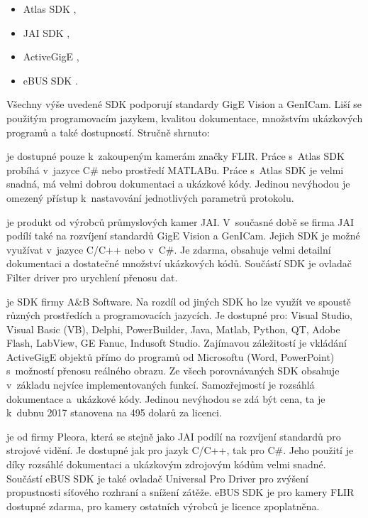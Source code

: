     \begin{itemize}[noitemsep]
    \item Atlas SDK \cite{atlasSdk},
    \item JAI SDK \cite{jaiSdk},
    \item ActiveGigE \cite{activeGige},
    \item eBUS SDK \cite{ebusSdk}.
    \end{itemize}
      
    Všechny výše uvedené SDK podporují standardy GigE Vision a GenICam. Liší se použitým programovacím jazykem, kvalitou dokumentace, množstvím ukázkových programů a také dostupností. Stručně shrnuto:
    
    \begin{description}[align=left]
	\item [Atlas SDK] je dostupné pouze k~zakoupeným kamerám značky FLIR. Práce s~Atlas SDK probíhá v~jazyce C\# nebo prostředí MATLABu. Práce s~Atlas SDK je velmi snadná, má velmi dobrou dokumentaci a ukázkové kódy. Jedinou nevýhodou je omezený přístup k~nastavování jednotlivých parametrů protokolu.
    \item [JAI SDK] je produkt od výrobců průmyslových kamer JAI. V~současné době se firma JAI podílí také na rozvíjení standardů GigE Vision a GenICam. Jejich SDK je možné využívat v~jazyce C/C++ nebo v~C\#. Je zdarma, obsahuje velmi detailní dokumentaci a dostatečné množství ukázkových kódů. Součástí SDK je ovladač Filter driver pro urychlení přenosu dat. 
    \item [ActiveGigE] je SDK firmy A\&B Software. Na rozdíl od jiných SDK ho lze využít ve spoustě různých prostředích a programovacích jazycích. Je dostupné pro: Visual Studio, Visual Basic (VB), Delphi, PowerBuilder, Java, Matlab, Python, QT, Adobe Flash, LabView, GE Fanuc, Indusoft Studio. Zajímavou záležitostí je vkládání ActiveGigE objektů přímo do programů od Microsoftu (Word, PowerPoint) s~možností přenosu reálného obrazu. Ze všech porovnávaných SDK obsahuje v~základu nejvíce implementovaných funkcí. Samozřejmostí je rozsáhlá dokumentace a~ukázkové kódy. Jedinou nevýhodou se zdá být cena, ta je k~dubnu 2017 stanovena na 495 dolarů za licenci.
    \item [eBUS SDK] je od firmy Pleora, která se stejně jako JAI podílí na rozvíjení standardů pro strojové vidění. Je dostupné jak pro jazyk C/C++, tak pro C\#. Jeho použití je díky rozsáhlé dokumentaci a ukázkovým zdrojovým kódům velmi snadné. Součástí eBUS SDK je také ovladač Universal Pro Driver pro zvýšení propustnosti síťového rozhraní a snížení zátěže. eBUS SDK je pro kamery FLIR dostupné zdarma, pro kamery ostatních výrobců je licence zpoplatněna.
    \end{description}
    


